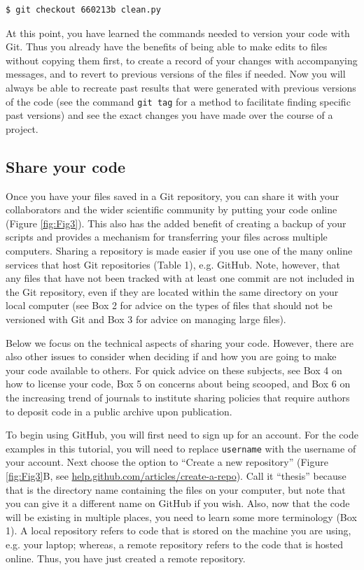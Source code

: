 \documentclass[10pt]{article}
\begin{document}
\begin{verbatim}
$ git checkout 660213b clean.py
\end{verbatim}

At this point, you have learned the commands needed to version your code with Git.
Thus you already have the benefits of being able to make edits to files without copying them first, to create a record of your changes with accompanying messages, and to revert to previous versions of the files if needed.
Now you will always be able to recreate past results that were generated with previous versions of the code (see the command \verb|git tag| for a method to facilitate finding specific past versions) and see the exact changes you have made over the course of a project.


\subsection{Share your code}

Once you have your files saved in a Git repository, you can share it with your collaborators and the wider scientific community by putting your code online (Figure \ref{fig:Fig3}).
This also has the added benefit of creating a backup of your scripts and provides a mechanism for transferring your files across multiple computers.
Sharing a repository is made easier if you use one of the many online services that host Git repositories (Table 1), e.g. GitHub.
Note, however, that any files that have not been tracked with at least one commit are not included in the Git repository, even if they are located within the same directory on your local computer (see Box 2 for advice on the types of files that should not be versioned with Git and Box 3 for advice on managing large files).

Below we focus on the technical aspects of sharing your code.
However, there are also other issues to consider when deciding if and how you are going to make your code available to others.
For quick advice on these subjects, see Box 4 on how to license your code, Box 5 on concerns about being scooped, and Box 6 on the increasing trend of journals to institute sharing policies that require authors to deposit code in a public archive upon publication.

To begin using GitHub, you will first need to sign up for an account.
For the code examples in this tutorial, you will need to replace \verb|username| with the username of your account.
Next choose the option to ``Create a new repository'' (Figure \ref{fig:Fig3}B, see \href{https://help.github.com/articles/create-a-repo/}{help.github.com/articles/create-a-repo}).
Call it ``thesis'' because that is the directory name containing the files on your computer, but note that you can give it a different name on GitHub if you wish.
Also, now that the code will be existing in multiple places, you need to learn some more terminology (Box 1).
A local repository refers to code that is stored on the machine you are using, e.g. your laptop; whereas, a remote repository refers to the code that is hosted online.
Thus, you have just created a remote repository.
\end{document}
